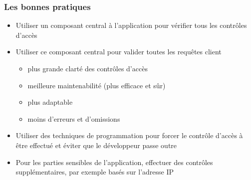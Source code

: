 \documentclass{beamer}
\begin{document}
\begin{frame}
  \frametitle{Les bonnes pratiques}
  \begin{exampleblock}{}
    \begin{itemize}
      \item Utiliser un composant central à l'application pour vérifier tous les contrôles d'accès
      \item Utiliser ce composant central pour valider toutes les requêtes client
      \begin{itemize}
        \item plus grande clarté des contrôles d'accès
        \item meilleure maintenabilité (plus efficace et sûr)
        \item plus adaptable
        \item moins d'erreurs et d'omissions
      \end{itemize}
    \end{itemize}
  \end{exampleblock}
  \begin{exampleblock}{}
    \begin{itemize}
      \item Utiliser des techniques de programmation pour forcer le contrôle d'accès à être effectué et éviter que le développeur passe outre
    \end{itemize}
  \end{exampleblock}
  \begin{exampleblock}{}
    \begin{itemize}
      \item Pour les parties sensibles de l'application, effectuer des contrôles supplémentaires, par exemple basés sur l'adresse IP
    \end{itemize}
  \end{exampleblock}
\end{frame}
\end{document}
